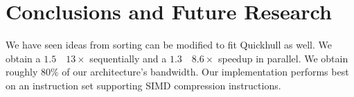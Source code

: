 \section{Conclusions and Future Research}

We have seen ideas from sorting can be modified to fit Quickhull as well.
We obtain a $1.5$~\textendash~$13\times$ sequentially and a 
$1.3$~\textendash~$8.6\times$ speedup in parallel. We obtain roughly $80\%$
of our architecture's bandwidth. Our implementation performs
best on an instruction set supporting SIMD compression instructions.
